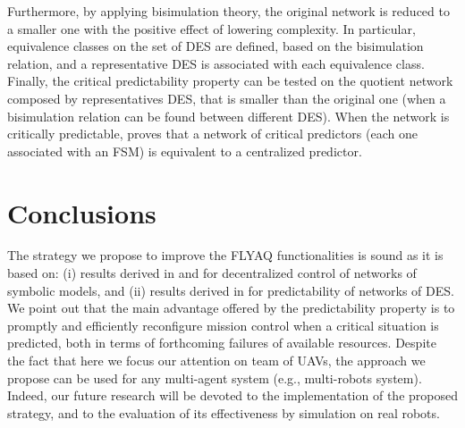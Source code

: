 \documentclass[letterpaper, 10 pt, conference]{ieeeconf}
\begin{document}
%
Furthermore, by applying bisimulation theory, the original network is reduced to a smaller one with the positive effect of lowering complexity. 
%
In particular, equivalence classes on the set of DES are defined, based on the bisimulation relation, and a representative DES is associated with each equivalence class. Finally, the critical predictability property can be tested on the quotient network composed by representatives DES, that is smaller than the original one (when a bisimulation relation can be found between different DES). When the network is critically predictable, \cite{LCSS18} proves that a network of critical predictors (each one associated with an FSM) is equivalent to a centralized predictor.


\section{Conclusions}\label{sec:Conclusion}
The strategy we propose to improve the FLYAQ functionalities is sound as it is based on: (i) results derived in \cite{Pola:TAC2016} and \cite{Pola:Decentralized} for decentralized control of networks of symbolic models, and (ii) results derived in \cite{LCSS18} for predictability of networks of DES. We point out that the main advantage offered by the predictability property is to promptly and efficiently reconfigure mission control when a critical situation is predicted, both in terms of forthcoming failures of available resources.
Despite the fact that here we focus our attention on team of UAVs, the approach we propose can be used for any multi-agent system (e.g., multi-robots system).
Indeed, our future research will be devoted to the implementation of the proposed strategy, and to the evaluation of its effectiveness by simulation on real robots.



\end{document}
